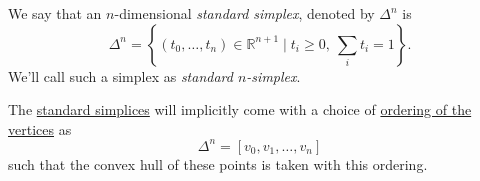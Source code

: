 \begin{definition}\label{def:standard-simplex}
	We say that an \(n\)-dimensional \emph{standard simplex}, denoted by \(\Delta^n\) is
	\[
		\Delta^n = \left\{(t_0, \dots , t_{n}) \in \mathbb{R}^{n+1} \mid t_i \geq 0,\ \sum\limits_{i}t_{i}  = 1 \right\}.
	\]
	We'll call such a simplex as \emph{standard \(n\)-simplex}.
	\begin{figure}[H]
		\centering
		\label{fig:def:standard-simplex}
	\end{figure}
\end{definition}

\begin{remark}
	The \hyperref[def:standard-simplex]{standard simplices} will implicitly come with a choice of \underline{ordering of the vertices} as
	\[
		\Delta ^n = [v_0, v_1, \dots , v_n ]
	\]
	such that the convex hull of these points is taken with this ordering.
\end{remark}